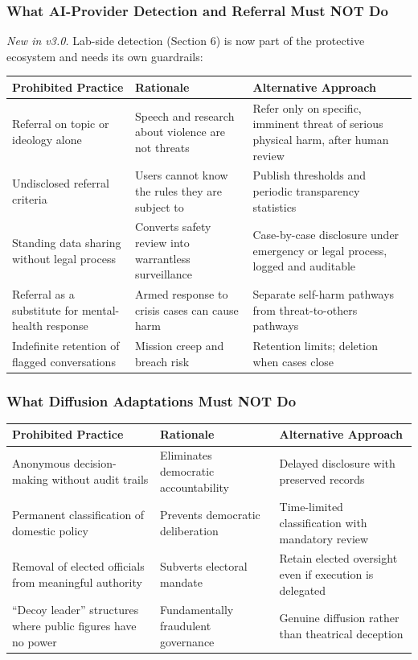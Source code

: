 \documentclass[11pt,letterpaper]{article}
\makeatletter
\newcommand{\etraneed}[1]{\par\if@nobreak\else\penalty\z@\ifdim\pagegoal<\maxdimen\ifdim\dimexpr\pagegoal-\pagetotal\relax<\dimexpr#1\relax\newpage\fi\fi\fi}
\makeatother
\begin{document}
\etraneed{16\baselineskip}
\subsubsection{What AI-Provider Detection and Referral Must NOT Do}

\textit{New in v3.0.} Lab-side detection (Section 6) is now part of the protective ecosystem and needs its own guardrails:

\begin{center}
\small
\begin{tabular}{L{3.8cm}L{4cm}L{5.2cm}}
\toprule
\textbf{Prohibited Practice} & \textbf{Rationale} & \textbf{Alternative Approach} \\
\midrule
Referral on topic or ideology alone & Speech and research about violence are not threats & Refer only on specific, imminent threat of serious physical harm, after human review \\
Undisclosed referral criteria & Users cannot know the rules they are subject to & Publish thresholds and periodic transparency statistics \\
Standing data sharing without legal process & Converts safety review into warrantless surveillance & Case-by-case disclosure under emergency or legal process, logged and auditable \\
Referral as a substitute for mental-health response & Armed response to crisis cases can cause harm & Separate self-harm pathways from threat-to-others pathways \\
Indefinite retention of flagged conversations & Mission creep and breach risk & Retention limits; deletion when cases close \\
\bottomrule
\end{tabular}
\end{center}

\subsubsection{What Diffusion Adaptations Must NOT Do}

\begin{center}
\small
\begin{tabular}{L{4cm}L{4cm}L{4cm}}
\toprule
\textbf{Prohibited Practice} & \textbf{Rationale} & \textbf{Alternative Approach} \\
\midrule
Anonymous decision-making without audit trails & Eliminates democratic accountability & Delayed disclosure with preserved records \\
Permanent classification of domestic policy & Prevents democratic deliberation & Time-limited classification with mandatory review \\
Removal of elected officials from meaningful authority & Subverts electoral mandate & Retain elected oversight even if execution is delegated \\
``Decoy leader'' structures where public figures have no power & Fundamentally fraudulent governance & Genuine diffusion rather than theatrical deception \\
\bottomrule
\end{tabular}
\end{center}
\end{document}
